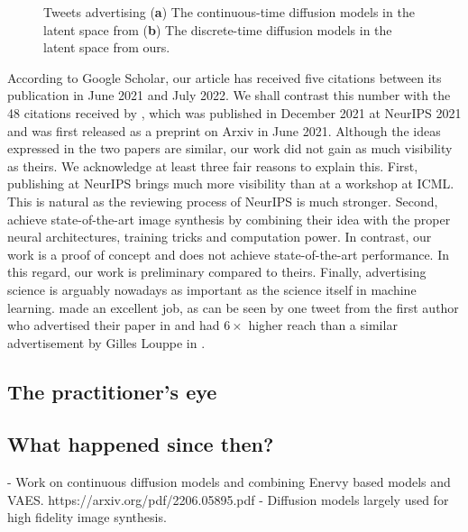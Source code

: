 \begin{figure}
\begin{subfigure}[b]{.48\textwidth}
    \caption{}
    \label{fig:discrete_tweet}
  \end{subfigure}
  \caption{Tweets advertising (\textbf{a}) The continuous-time diffusion models in the latent space from \citet{vahdat2021score} (\textbf{b}) The discrete-time diffusion models in the latent space from ours.}
\end{figure}

According to Google Scholar, our article has received five citations between its publication in June 2021 and July 2022. We shall contrast this number with the 48 citations received by \citet{vahdat2021score}, which was published in December 2021 at NeurIPS 2021 and was first released as a preprint on Arxiv in June 2021. Although the ideas expressed in the two papers are similar, our work did not gain as much visibility as theirs. We acknowledge at least three fair reasons to explain this. First, publishing at NeurIPS brings much more visibility than at a workshop at ICML. This is natural as the reviewing process of NeurIPS is much stronger. Second, \citet{vahdat2021score} achieve state-of-the-art image synthesis by combining their idea with the proper neural architectures, training tricks and computation power.
In contrast, our work is a proof of concept and does not achieve state-of-the-art performance. In this regard, our work is preliminary compared to theirs. Finally, advertising science is arguably nowadays as important as the science itself in machine learning.\citet{vahdat2021score} made an excellent job, as can be seen by one tweet from the first author who advertised their paper in  and had $6\times$ higher reach than a similar advertisement by Gilles Louppe in .
\subsection{The practitioner's eye}

\subsection{What happened since then?}
- Work on continuous diffusion models and combining Enervy based models and VAES.
https://arxiv.org/pdf/2206.05895.pdf
- Diffusion models largely used for high fidelity image synthesis.
